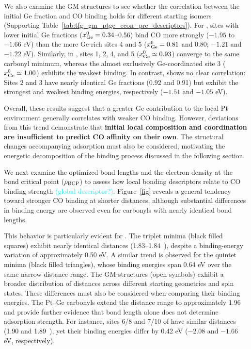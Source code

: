 We also examine the GM structures to see whether the correlation between the initial Ge fraction and CO binding holds for different starting isomers (Supporting Table~\ref{tab:tfg_gm_ptge_econ_pre_descriptors}). For , sites with lower initial Ge fractions ($x_{\rm Ge}^{0}=0.34$--0.56) bind CO more strongly ($-1.95$ to $-1.66$ eV) than the more Ge-rich sites 4 and 5 ($x_{\rm Ge}^{0}=0.81$ and 0.80; $-1.21$ and $-1.22$ eV). Similarly, in , sites 1, 2, 4, and 5 ($x_{\rm Ge}^{0}\simeq0.93$) converge to the same carbonyl minimum, whereas the almost exclusively Ge-coordinated site 3 ($x_{\rm Ge}^{0}\simeq1.00$) exhibits the weakest binding. In contrast,  shows no clear correlation: Sites 2 and 3 have nearly identical Ge fractions (0.92 and 0.91) but exhibit the strongest and weakest binding energies, respectively ($-1.51$ and $-1.05$ eV).

Overall, these results suggest that a greater Ge contribution to the local Pt environment generally correlates with weaker CO binding. However, deviations from this trend demonstrate that \textbf{initial local composition and coordination are insufficient to predict CO affinity on their own}. The structural changes accompanying adsorption must also be considered, motivating the energetic decomposition of the binding process discussed in the following section.

We next examine the optimized  bond lengths and the electron density at the bond critical point ($\rho_{\rm BCP}$) to assess how local bonding descriptors relate to CO binding strength \textcolor{cyan}{(global descriptor?)}. Figure~\ref{fig} reveals a general tendency toward stronger CO binding at shorter  distances, although substantial differences in binding energy are observed even for carbonyls with nearly identical bond lengths.

This behavior is particularly evident for . The triplet minima (black filled squares) exhibit nearly identical  distances (1.83--1.84~\si{\angstromunit}), despite a binding-energy variation of approximately 0.50 eV. A similar trend is observed for the quintet minima (black filled triangles), whose binding energies span 0.64 eV over the same narrow distance range. The GM structures (open symbols) exhibit a broader distribution of  distances {across different starting geometries and spin states. These differences must also be considered when comparing their binding energies}. The Pt–Ge carbonyls extend the distance range to approximately 1.96~\si{\angstromunit} and provide further evidence that bond length alone does not determine adsorption strength. For instance, sites 6/8 and 7/10 of  have similar  distances (1.90 and 1.89~\si{\angstromunit}), yet their binding energies differ by 0.42 eV ($-2.08$ and $-1.66$ eV, respectively).

